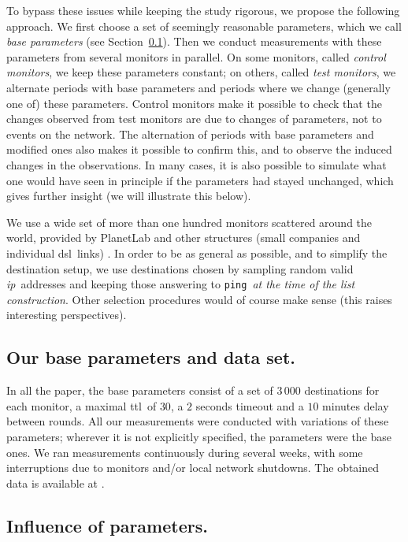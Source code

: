 \documentclass[times, 10pt,twocolumn]{article}
\newcommand{\ping}{{\tt ping}}
\newcommand{\ip}{\mbox{\em \sc ip}}
\newcommand{\ttl}{\mbox{\sc ttl}}
\newcommand{\dsl}{\mbox{\sc dsl}}
\begin{document}
To bypass these issues while keeping the study rigorous, we propose
the following approach. We first choose a set of seemingly reasonable
parameters, which we call {\em base parameters} (see
Section~\ref{sec_base}). Then we conduct measurements with these
parameters from several monitors in parallel.
On some monitors,
called {\em control monitors}, we keep these parameters constant;
on others, called {\em test monitors}, we alternate periods with base
parameters and periods where we change (generally one of) these
parameters.
Control monitors make it possible to check
that the changes observed from test monitors are due to changes of
parameters, not to events on the network. The alternation of periods
with base parameters and modified ones also makes it possible to
confirm this, and to observe the induced changes in the observations.
In many cases, it is also possible to simulate what one would have
seen in principle if the parameters had stayed unchanged, which gives
further insight (we will illustrate this below).

We use a wide set of more than one hundred monitors scattered around
the world, provided by PlanetLab \cite{planetLab} and other structures
(small companies and individual \dsl\ links) \cite{radarurl}.  In
order to be as general as possible, and to simplify the destination
setup, we use destinations chosen by sampling random valid \ip\
addresses and keeping those answering to \ping\ {\em at the time of
  the list construction}. Other selection procedures would of course
make sense (this raises interesting perspectives).



\subsection{Our base parameters and data set.}
\label{sec_base}

In all the paper, the base parameters consist of a set of $3\,000$ destinations for each monitor, a maximal \ttl\ of $30$, a $2$ seconds timeout and a $10$ minutes delay between rounds. All our measurements were conducted with variations of these parameters; wherever it is not explicitly specified, the parameters were the base ones. We ran measurements continuously during several weeks, with some interruptions due to monitors and/or local network shutdowns.
The obtained data is available at \cite{radarurl}.


\subsection{Influence of parameters.}
\label{sec_influence}
\end{document}
